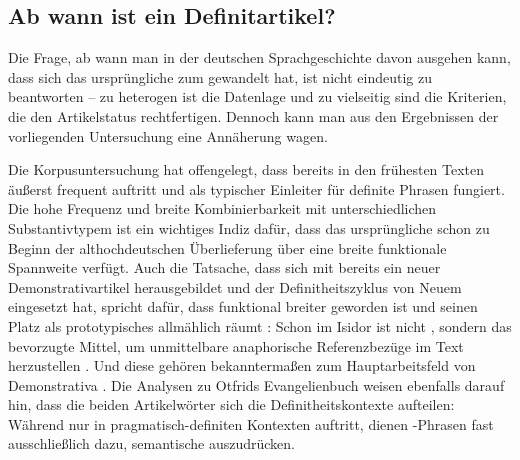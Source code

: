 \subsection{Ab wann ist  ein Definitartikel?}\label{sec:abwann}

Die Frage, ab wann man in der deutschen Sprachgeschichte davon ausgehen kann, dass sich das ursprüngliche   zum  gewandelt hat, ist nicht eindeutig zu beantworten -- zu heterogen ist die Datenlage und zu vielseitig sind die Kriterien, die den Artikelstatus rechtfertigen. Dennoch kann man aus den Ergebnissen der vorliegenden Untersuchung eine Annäherung wagen. 

Die Korpusuntersuchung hat offengelegt, dass  bereits in den frühesten Texten äußerst frequent auftritt und als typischer Einleiter für definite Phrasen fungiert. Die hohe Frequenz und breite Kombinierbarkeit mit unterschiedlichen Substantivtypem ist ein wichtiges Indiz dafür, dass das ursprüngliche  schon zu Beginn der althochdeutschen Überlieferung über eine breite funktionale Spannweite verfügt. Auch die Tatsache, dass sich mit  bereits ein neuer Demonstrativartikel herausgebildet und der Definitheitszyklus \parencite{Greenberg1978,vanGelderen2007} von Neuem eingesetzt hat, spricht dafür, dass  funktional breiter geworden ist und seinen Platz als prototypisches  allmählich räumt \parencite[ähnlich auch][]{Schlachter2012}: Schon im Isidor ist nicht , sondern   das bevorzugte Mittel, um unmittelbare anaphorische  Referenzbezüge im Text herzustellen \parencite[139]{Oubouzar1989}. Und diese gehören bekanntermaßen zum Hauptarbeitsfeld von Demonstrativa   \parencite{Diessel1999}. Die Analysen zu Otfrids Evangelienbuch weisen ebenfalls darauf hin, dass die beiden Artikelwörter sich die Definitheitskontexte  aufteilen: Während  nur in pragmatisch-definiten  Kontexten auftritt, dienen -Phrasen fast ausschließlich dazu, semantische   auszudrücken. 

